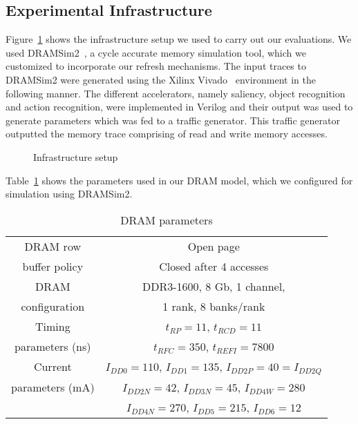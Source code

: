 \subsection{Experimental Infrastructure}
Figure~\ref{fig:experimental-setup} shows the infrastructure setup we used to carry out our evaluations.
We used DRAMSim2~\cite{DRAMsim2}, a cycle accurate memory simulation tool, which we customized to incorporate our refresh mechanisms. 
The input traces to DRAMSim2 were generated using the Xilinx Vivado~\cite{vivado} environment in the following manner.
The different accelerators, namely saliency, object recognition and action recognition, were implemented in Verilog and their output was used to generate parameters which was fed to a traffic generator.
This traffic generator outputted the memory trace comprising of read and write memory accesses.

\begin{figure}[ht!]
\centering
{}
\caption{\label{fig:experimental-setup} Infrastructure setup}
\end{figure}

Table~\ref{tab:dram-parameters} shows the parameters used in our DRAM model, which we configured for simulation using DRAMSim2.


\begin{table}[ht!]
\footnotesize
\centering
\begin{tabular}{|c|c|} \hline
DRAM row & Open page\\
buffer policy & Closed after 4 accesses\\\hline
DRAM & DDR3-1600, 8 Gb, 1 channel,\\
configuration &  1 rank, 8 banks/rank \\\hline
Timing & $t_{RP}=11$, $t_{RCD}=11$\\
parameters (ns) & $t_{RFC}=350$, $t_{REFI}=7800$ \\\hline
Current & $I_{DD0}=110$, $I_{DD1}=135$, $I_{DD2P}=40=I_{DD2Q}$ \\ 
parameters (mA) & $I_{DD2N}=42$, $I_{DD3N}=45$, $I_{DD4W}=280$ \\ 
&$I_{DD4N}=270$, $I_{DD5}=215$, $I_{DD6}=12$ \\\hline
\end{tabular}
\vspace{0.1in}
\caption {DRAM parameters}
\vspace{-0.2in}
\label{tab:dram-parameters}
\end{table}

